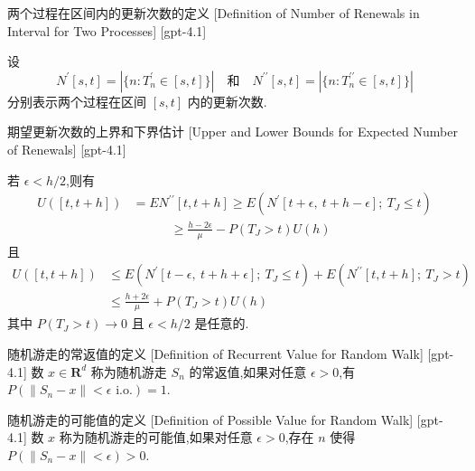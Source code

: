 \documentclass[UTF8]{ctexart}
\begin{document}
    
    
    \begin{dfn}
        {两个过程在区间内的更新次数的定义}
        [Definition of Number of Renewals in Interval for Two Processes]
        [gpt-4.1]
        
设
\[
N^{\prime}[s, t] = |\{n : T_{n}^{\prime} \in [s, t]\}| \quad \text{和} \quad N^{\prime\prime}[s, t] = |\{n : T_{n}^{\prime\prime} \in [s, t]\}|
\]
分别表示两个过程在区间 $[s, t]$ 内的更新次数.

    \end{dfn}
    
    
    
    \begin{thm}
        {期望更新次数的上界和下界估计}
        [Upper and Lower Bounds for Expected Number of Renewals]
        [gpt-4.1]
        
若 $\epsilon < h/2$,则有
\[
\begin{array}{rl}
U([t, t + h]) &= E N^{\prime\prime}[t, t + h] \geq E(N^{\prime}[t + \epsilon,\ t + h - \epsilon];\ T_{J} \leq t) \\
& \qquad \quad \geq \displaystyle \frac{h - 2\epsilon}{\mu} - P(T_{J} > t) U(h)
\end{array}
\]
且
\[
\begin{array}{rl}
U([t, t + h]) &\leq E(N^{\prime}[t - \epsilon,\ t + h + \epsilon];\ T_{J} \leq t) + E(N^{\prime\prime}[t, t + h];\ T_{J} > t) \\
&\leq \frac{h + 2\epsilon}{\mu} + P(T_{J} > t) U(h)
\end{array}
\]
其中 $P(T_{J} > t) \to 0$ 且 $\epsilon < h / 2$ 是任意的.

    \end{thm}
    
    
    
    \begin{dfn}
        {随机游走的常返值的定义}
        [Definition of Recurrent Value for Random Walk]
        [gpt-4.1]
        数 $x \in \mathbf{R}^d$ 称为随机游走 $S_n$ 的常返值,如果对任意 $\epsilon > 0$,有 $P(\| S_n - x \| < \epsilon \text{ i.o.}) = 1$.
    \end{dfn}
    
    
    
    \begin{dfn}
        {随机游走的可能值的定义}
        [Definition of Possible Value for Random Walk]
        [gpt-4.1]
        数 $x$ 称为随机游走的可能值,如果对任意 $\epsilon > 0$,存在 $n$ 使得 $P(\| S_n - x \| < \epsilon) > 0$.
    \end{dfn}
    
\end{document}
